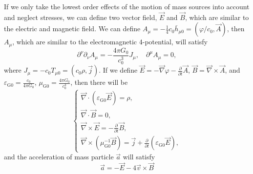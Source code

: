 \documentclass{article}
\def\p{\partial}
\begin{document}
If we only take the lowest order effects of the motion of mass sources into account and neglect stresses, we can define two vector field, $\vec{E}$ and $\vec{B}$, which are similar to the electric and magnetic field. We can define $A_\mu=-\frac{1}{4}c_0\bar{h}_{\mu 0}=(\varphi/c_0,\vec{A})$, then $A_\mu$, which are similar to the electromagnetic 4-potential, will satisfy
\begin{equation}
    \p^\nu\p_\nu A_\mu=-\frac{4\pi G_0}{c_0^3}J_\mu,\quad\p^\mu A_\mu=0,
\end{equation}
where $J_\mu=-c_0T_{\mu 0}=(c_0\rho,\vec{j})$. If we define $\vec{E}=-\vec{\nabla}\varphi-\frac{\p}{\p t}\vec{A}$, $\vec{B}=\vec{\nabla}\times\vec{A}$, and $\varepsilon_{\text{G}0}=\frac{c_0}{4\pi G_0}$, $\mu_{\text{G}0}=\frac{4\pi G_0}{c_0^3}$, then there will be
\begin{equation}
    \begin{cases}
        \vec{\nabla}\cdot(\varepsilon_{\text{G}0}\vec{E})=\rho,\\
        \vec{\nabla}\cdot\vec{B}=0,\\
        \vec{\nabla}\times\vec{E}=-\frac{\p}{\p t}\vec{B},\\
        \vec{\nabla}\times(\mu_{\text{G}0}^{-1}\vec{B})=\vec{j}+\frac{\p}{\p t}(\varepsilon_{\text{G}0}\vec{E}),
    \end{cases}
\end{equation}
and the acceleration of mass particle $\vec{a}$ will satisfy
\begin{equation}
    \vec{a}=-\vec{E}-4\vec{v}\times\vec{B}
\end{equation}
\end{document}
